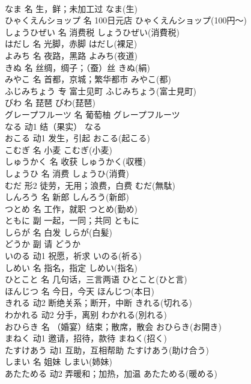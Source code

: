 \documentclass[8pt]{extreport}
\begin{document}
\begin{CJK}{UTF8}{min}
\\	なま	名	生，鲜；未加工过	なま(生)	
\\	ひゃくえんショップ	名	100日元店	ひゃくえんショップ(100円～)	
\\	しょうひぜい	名	消费税	しょうひぜい(消費税)	
\\	はだし	名	光脚，赤脚	はだし(裸足)	
\\	よみち	名	夜路，黑路	よみち(夜道)	
\\	きぬ	名	丝绸，绸子；（蚕）丝	きぬ(絹)	
\\	みやこ	名	首都，京城；繁华都市	みやこ(都)	
\\	ふじみちょう	专	富士见町	ふじみちょう(富士見町)	
\\	びわ	名	琵琶	びわ(琵琶)	
\\	グレープフルーツ	名	葡萄柚	グレープフルーツ	
\\	なる	动1	结（果实）	なる	
\\	おこる	动1	发生，引起	おこる(起こる)	
\\	こむぎ	名	小麦	こむぎ(小麦)	
\\	しゅうかく	名	收获	しゅうかく(収穫)	
\\	しょうひ	名	消费	しょうひ(消費)	
\\	むだ	形2	徒劳，无用；浪费，白费	むだ(無駄)	
\\	しんろう	名	新郎	しんろう(新郎)	
\\	つとめ	名	工作，就职	つとめ(勤め)	
\\	ともに	副	一起，一同；共同	ともに	
\\	しらが	名	白发	しらが(白髪)	
\\	どうか	副	请	どうか	
\\	いのる	动1	祝愿，祈求	いのる(祈る)	
\\	しめい	名	指名，指定	しめい(指名)	
\\	ひとこと	名	几句话，三言两语	ひとこと(ひと言)	
\\	ほんじつ	名	今日，今天	ほんじつ(本日)	
\\	きれる	动2	断绝关系；断开，中断	きれる(切れる)	
\\	わかれる	动2	分手，离别	わかれる(別れる)	
\\	おひらき	名	（婚宴）结束；散席，散会	おひらき(お開き)	
\\	まねく	动1	邀请，招待，款待	まねく(招く)	
\\	たすけあう	动1	互助，互相帮助	たすけあう(助け合う)	
\\	しまい	名	姐妹	しまい(姉妹)	
\\	あたためる	动2	弄暖和；加热，加温	あたためる(暖める)	

\end{CJK}
\end{document}
